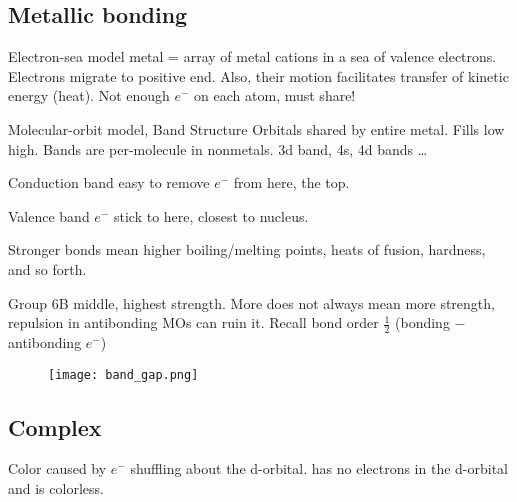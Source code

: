 \begin{mdframed}
\subsection{Metallic bonding}

\begin{multicols}{2}
\begin{compactdesc}
    \item[Electron-sea model] metal = array of metal cations in a sea of
        valence electrons. Electrons migrate to positive end. Also, their
        motion facilitates transfer of kinetic energy (heat).
        Not enough $e^-$ on each atom, must share!
    \item[Molecular-orbit model, Band Structure]
        Orbitals shared by entire metal. Fills low \ce{->} high.
        Bands are per-molecule in nonmetals. 3d band, 4s, 4d bands \dots
    \item[Conduction band] easy to remove $e^-$ from here, the top.
    \item[Valence band] $e^-$ stick to here, closest to nucleus.
    \item[Stronger bonds] mean higher boiling/melting points, heats of fusion,
        hardness, and so forth.
    \item[Group 6B] middle, highest strength. More does not always mean more
        strength, repulsion in antibonding MOs can ruin it. Recall bond order
        $\frac{1}{2}$ (bonding $-$ antibonding $e^-$)
\end{compactdesc}
\end{multicols}

\begin{figure}[H]
    \centering
    \texttt{[image: band\_gap.png]}
\end{figure}

\end{mdframed}



\begin{mdframed}
\subsection{Complex}

\begin{multicols}{2}
\begin{compactdesc}
\item[Color] caused by $e^{-}$ shuffling about the d-orbital.  has
    no electrons in the d-orbital and is colorless.
\end{compactdesc}
\end{multicols}
\end{mdframed}




